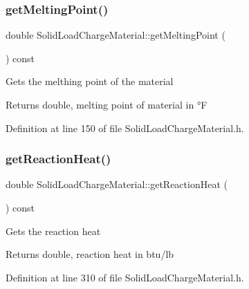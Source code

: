 \subsubsection{\texorpdfstring{get\+Melting\+Point()}{getMeltingPoint()}\hspace{0.1cm}{\footnotesize\ttfamily [3/3]}}
{\footnotesize\ttfamily double Solid\+Load\+Charge\+Material\+::get\+Melting\+Point (\begin{DoxyParamCaption}{ }\end{DoxyParamCaption}) const\hspace{0.3cm}{\ttfamily [inline]}}

Gets the melthing point of the material \begin{DoxyReturn}{Returns}
double, melting point of material in °F 
\end{DoxyReturn}


Definition at line 150 of file Solid\+Load\+Charge\+Material.\+h.

\mbox{\label{class_solid_load_charge_material_a3481dc84063babc3514a4173e6bd9341}} 
\subsubsection{\texorpdfstring{get\+Reaction\+Heat()}{getReactionHeat()}\hspace{0.1cm}{\footnotesize\ttfamily [1/3]}}
{\footnotesize\ttfamily double Solid\+Load\+Charge\+Material\+::get\+Reaction\+Heat (\begin{DoxyParamCaption}{ }\end{DoxyParamCaption}) const\hspace{0.3cm}{\ttfamily [inline]}}

Gets the reaction heat \begin{DoxyReturn}{Returns}
double, reaction heat in btu/lb 
\end{DoxyReturn}


Definition at line 310 of file Solid\+Load\+Charge\+Material.\+h.

\mbox{\label{class_solid_load_charge_material_a3481dc84063babc3514a4173e6bd9341}} 
